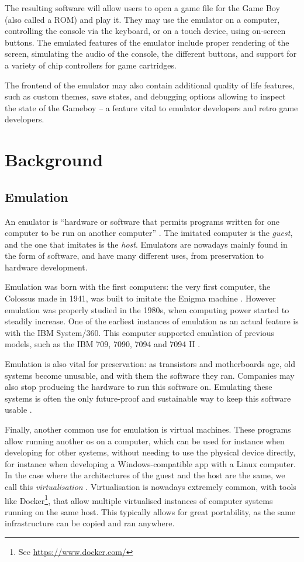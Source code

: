 \documentclass[11pt]{informatics-report}
\newcommand{\ftnt}[1]{\footnote{See \url{#1}}}
\begin{document}
The resulting software will allow users to open a game file for the Game Boy (also called a ROM) and play it. They may use the emulator on a computer, controlling the console via the keyboard, or on a touch device, using on-screen buttons. The emulated features of the emulator include proper rendering of the screen, simulating the audio of the console, the different buttons, and support for a variety of chip controllers for game cartridges.

The frontend of the emulator may also contain additional quality of life features, such as custom themes, save states, and debugging options allowing to inspect the state of the Gameboy -- a feature vital to emulator developers and retro game developers.

\chapter{Background}

\section{Emulation}

An emulator is ``hardware or software that permits programs written for one computer to be run on another computer'' \cite{emulator_def}. The imitated computer is the \textit{guest}, and the one that imitates is the \textit{host}. Emulators are nowadays mainly found in the form of software, and have many different uses, from preservation to hardware development.

Emulation was born with the first computers: the very first computer, the Colossus made in 1941, was built to imitate the Enigma machine \cite{emulator_origin}. However emulation was properly studied in the 1980s, when computing power started to steadily increase. One of the earliest instances of emulation as an actual feature is with the IBM System/360. This computer supported emulation of previous models, such as the IBM 709, 7090, 7094 and 7094 II \cite{ibm_emulation}.

Emulation is also vital for preservation: as transistors and motherboards age, old systems become unusable, and with them the software they ran.  Companies may also stop producing the hardware to run this software on. Emulating these systems is often the only future-proof and sustainable way to keep this software usable \cite{emu_preservation}.

Finally, another common use for emulation is virtual machines. These programs allow running another \gls{os} on a computer, which can be used for instance when developing for other systems, without needing to use the physical device directly, for instance when developing a Windows-compatible app with a Linux computer. In the case where the architectures of the guest and the host are the same, we call this \textit{virtualisation} \cite{emu_vs_virtu}. Virtualisation is nowadays extremely common, with tools like Docker\ftnt{https://www.docker.com/}, that allow multiple virtualised instances of computer systems running on the same host. This typically allows for great portability, as the same infrastructure can be copied and ran anywhere.
\end{document}
